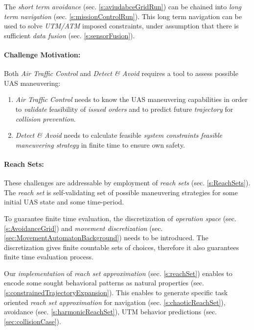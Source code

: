 The \emph{short term avoidance} (sec. \ref{s:aviudabceGridRun}) can be chained into \emph{long term navigation} (sec. \ref{s:missionControlRun}). This long term navigation can be used to solve \emph{UTM/ATM} imposed constraints, under assumption that there is sufficient \emph{data fusion} (sec. \ref{s:sensorFusion}).

\paragraph{Challenge Motivation:} Both \emph{Air Traffic Control} and \emph{Detect \& Avoid} requires a tool to assess possible UAS maneuvering:

\begin{enumerate}
    \item \emph{Air Traffic Control} needs to know the UAS maneuvering capabilities in order to \emph{validate} feasibility of \emph{issued orders} and to predict future \emph{trajectory} for \emph{collision prevention}.
    
    \item \emph{Detect \& Avoid} needs to calculate feasible \emph{system constraints feasible maneuvering strategy} in finite time to ensure own safety. 
\end{enumerate}

\paragraph{Reach Sets:} These challenges are addressable by employment of \emph{reach sets} (sec. \ref{s:ReachSets}). The \emph{reach set} is self-validating set of possible maneuvering strategies for some initial UAS state and some time-period. 

To guarantee finite time evaluation, the discretization of \emph{operation space} (sec. \ref{s:AvoidanceGrid}) and \emph{movement discretization} (sec. \ref{sec:MovementAutomatonBackground}) needs to be introduced. The discretization gives finite countable sets of choices, therefore it also guarantees finite time evaluation process.

Our \emph{implementation} of \emph{reach set approximation} (sec. \ref{s:reachSet}) enables to encode some sought behavioral patterns as natural properties (sec. \ref{s:constrainedTrajectoryExpansion}). This enables to generate specific task oriented \emph{reach set approximation} for navigation (sec. \ref{s:chaoticReachSet}), avoidance (sec. \ref{s:harmonicReachSet}), UTM behavior predictions (sec. \ref{sec:collisionCase}). 

